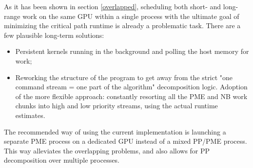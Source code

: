 \documentclass[12pt,a4paper]{report}
\begin{document}
As it has been shown in section \ref{overlapped}, scheduling both short- and long-range work on the same GPU within a single process with the ultimate goal of minimizing the critical path runtime is already a problematic task.
There are a few plausible long-term solutions: 
\begin{itemize}
\item Persistent kernels running in the background and polling the host memory for work;
\item Reworking the structure of the program to get away from the strict "one command stream = one part of the algorithm" decomposition logic. Adoption of the more flexible approach: constantly resorting all the PME and NB work chunks into high and low priority streams, using the actual runtime estimates.
\end{itemize}

The recommended way of using the current implementation is launching a separate PME process on a dedicated GPU instead of a mixed PP/PME process. This way alleviates the overlapping problems, and also allows for PP decomposition over multiple processes.

\end{document}
